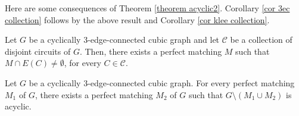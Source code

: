\documentclass[]{theclass}
\begin{document}
Here are some consequences of Theorem \ref{theorem acyclic2}. Corollary \ref{cor 3ec collection} follows by the above result and Corollary \ref{cor klee collection}.

\begin{corollary}\label{cor 3ec collection}
Let $G$ be a cyclically 3-edge-connected cubic graph and let $\mathcal{C}$ be a collection of disjoint circuits of $G$. Then, there exists a perfect matching $M$ such that $M\cap E(C)\neq \emptyset$, for every $C\in\mathcal{C}$.
\end{corollary}

\begin{corollary}
Let $G$ be a cyclically 3-edge-connected cubic graph. For every perfect matching $M_1$ of $G$, there exists a perfect matching $M_2$ of $G$ such that $G\setminus (M_1\cup M_2)$ is acyclic.
\end{corollary}
\end{document}
